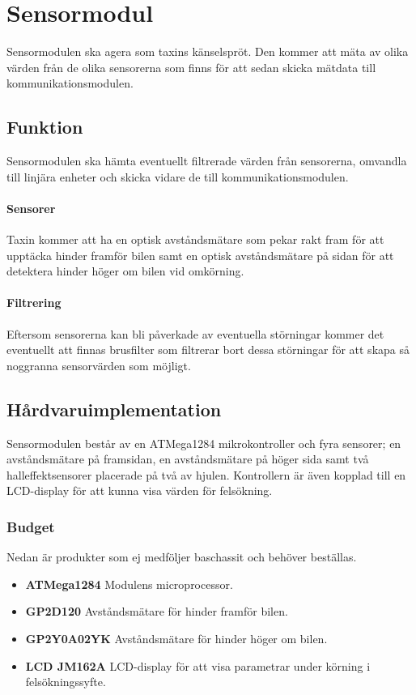\documentclass[designspec/spec.tex]{subfiles}
\begin{document}
\section{Sensormodul}
Sensormodulen ska agera som taxins känselspröt. Den kommer att mäta av olika
värden från de olika sensorerna som finns för att sedan skicka mätdata till
kommunikationsmodulen.

\subsection{Funktion}
Sensormodulen ska hämta eventuellt filtrerade värden från sensorerna, omvandla
till linjära enheter och skicka vidare de till kommunikationsmodulen.

\paragraph{Sensorer}
Taxin kommer att ha en optisk avståndsmätare som pekar rakt fram för att
upptäcka hinder framför bilen samt en optisk avståndsmätare på sidan för att
detektera hinder höger om bilen vid omkörning.

\paragraph{Filtrering}
Eftersom sensorerna kan bli påverkade av eventuella störningar kommer det
eventuellt att finnas brusfilter som filtrerar bort dessa störningar för att
skapa så noggranna sensorvärden som möjligt.

\subsection{Hårdvaruimplementation} 
Sensormodulen består av en ATMega1284 mikrokontroller och fyra sensorer; en
avståndsmätare på framsidan, en avståndsmätare på höger sida samt två
halleffektsensorer placerade på två av hjulen. Kontrollern är även kopplad till
en LCD-display för att kunna visa värden för felsökning.

\subsubsection{Budget}
Nedan är produkter som ej medföljer baschassit och behöver beställas.
\begin{itemize}
	\item \textbf{ATMega1284} Modulens microprocessor. 
    \item \textbf{GP2D120} Avståndsmätare för hinder framför bilen.
    \item \textbf{GP2Y0A02YK} Avståndsmätare för hinder höger om bilen.
    \item \textbf{LCD JM162A} LCD-display för att visa parametrar under körning
    i felsökningssyfte.
\end{itemize}
\end{document}
